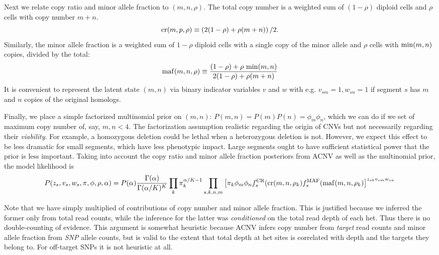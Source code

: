\documentclass[nofootinbib,amssymb,amsmath]{revtex4}
\begin{document}
Next we relate copy ratio and minor allele fraction to $(m, n, \rho)$.  The total copy number is a weighted sum of $(1-\rho)$ diploid cells and $\rho$ cells with copy number $m+n$.  
%
\begin{equation}
{\rm cr}(m, p, \rho) \equiv \left( 2(1-\rho) + \rho(m + n) \right)/2.
\end{equation}
%
Similarly, the minor allele fraction is a weighted sum of $1 - \rho$ diploid cells with a single copy of the minor allele and $\rho$ cells with ${\rm min}(m,n)$ copies, divided by the total:
%
\begin{equation}
{\rm maf}(m, n, \rho) \equiv \frac{(1- \rho) + \rho ~ {\rm min}(m,n)}{2(1-\rho) + \rho (m + n)}
\end{equation}
%
It is convenient to represent the latent state $(m,n)$ via binary indicator variables $v$ and $w$ with e.g. $v_{sm} = 1, w_{sn} = 1$ if segment $s$ has $m$ and $n$ copies of the original homologs.

Finally, we place a simple factorized multinomial prior on $(m,n)$: $P(m,n) = P(m)P(n) = \phi_m \phi_n$, which we can do if we set of maximum copy number of, say, $m, n < 4$.  The factorization assumption realistic regarding the origin of CNVs but not necessarily regarding their \textit{viability}.  For example, a homozygous deletion could be lethal when a heterozygous deletion is not.  However, we expect this effect to be less dramatic for small segments, which have less phenotypic impact.  Large segments ought to have sufficient statistical power that the prior is less important.  Taking into account the copy ratio and minor allele fraction posteriors from ACNV as well as the multinomial prior, the model likelihood is
%
\begin{equation}
P(z_s, v_s, w_s, \pi, \phi, \rho, \alpha) = P(\alpha) \frac{ \Gamma(\alpha) }{\Gamma(\alpha/K)^K} \prod_k \pi_k^{\alpha/K - 1} \prod_{s, k,n,m} \left[ \pi_k \phi_m \phi_n f_s^{\rm CR}({\rm cr}(m,n,\rho_k) f_s^{\rm MAF}({\rm maf}(m,n,\rho_k) \right]^{z_{sk} v_{sm} w_{sn}}
\end{equation}
%

Note that we have simply multiplied of contributions of copy number and minor allele fraction.  This is justified because we inferred the former only from total read counts, while the inference for the latter was \textit{conditioned} on the total read depth of each het.  Thus there is no double-counting of evidence.  This argument is somewhat heuristic because ACNV infers copy number from \textit{target} read counts and minor allele fraction from \textit{SNP} allele counts, but is valid to the extent that total depth at het sites is correlated with depth and the targets they belong to.  For off-target SNPs it is not heuristic at all.
\end{document}
